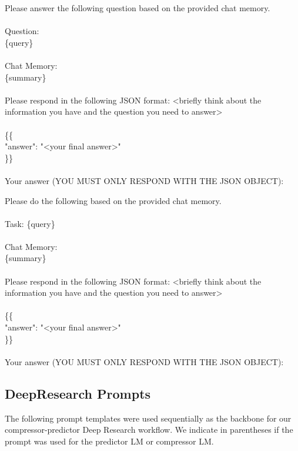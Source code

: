 \documentclass{article} %
\newcommand{\tab}{\hspace*{2em}}
\begin{document}
\begin{examplebox}
    \ttfamily
Please answer the following question based on the provided chat memory.\\
\\
Question:\\
\{query\}\\
\\
Chat Memory:\\
\{summary\}\\
\\
Please respond in the following JSON format:
<briefly think about the information you have and the question you need to answer>\\
\\
\{\{\\
\tab "answer": "<your final answer>" \\
\}\} \\
\\
Your answer (YOU MUST ONLY RESPOND WITH THE JSON OBJECT):
\end{examplebox}

\begin{examplebox}
    \ttfamily
Please do the following based on the provided chat memory.\\
\\
Task:
\{query\}\\
\\
Chat Memory:\\
\{summary\}\\
\\
Please respond in the following JSON format:
<briefly think about the information you have and the question you need to answer>\\
\\
\{\{\\
\tab "answer": "<your final answer>"\\
\}\}\\
\\
Your answer (YOU MUST ONLY RESPOND WITH THE JSON OBJECT):
\end{examplebox}

\subsection{DeepResearch Prompts}
The following prompt templates were used sequentially as the backbone for our compressor-predictor Deep Research workflow. We indicate in parentheses if the prompt was used for the predictor LM or compressor LM.
\end{document}
